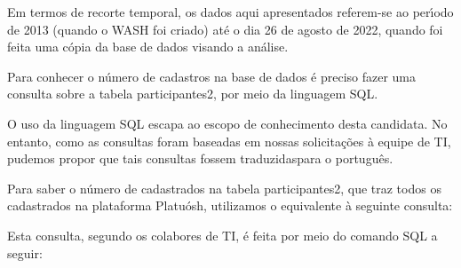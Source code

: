 \documentclass[
12pt,		%
openright,	%
twoside,  %
a4paper,			%
chapter=TITLE,		%
english,			%
french,				%
spanish,			%
brazil				%
]{USPSC-classe/USPSC_RedarTex}
\begin{document}
Em termos de recorte temporal, os dados aqui apresentados referem-se ao per\'{\i}odo de 2013 (quando o WASH foi criado) at\'e o dia 26 de agosto de 2022, quando foi feita uma c\'opia da base de dados visando a an\'alise.








Para conhecer o n\'umero de cadastros na base de dados \'e preciso fazer uma consulta sobre a tabela \textquotedbl participantes2\textquotedbl , por meio da linguagem SQL.








O uso da linguagem SQL escapa ao escopo de conhecimento desta candidata. No entanto, como as consultas foram baseadas em nossas solicita\c{c}\~oes \`a equipe de TI, pudemos propor que tais consultas fossem \textquotedbl traduzidas\textquotedbl  para o portugu\^es.








Para saber o n\'umero de cadastrados na tabela participantes2, que traz todos os cadastrados na plataforma Platu\'osh, utilizamos o equivalente \`a seguinte consulta:









\noindent\begin{center}\mbox{\centering{}}\end{center}











Esta consulta, segundo os colabores de TI, \'e feita por meio do comando SQL a seguir:









\noindent\begin{center}\mbox{\centering{}}\end{center}
\end{document}
